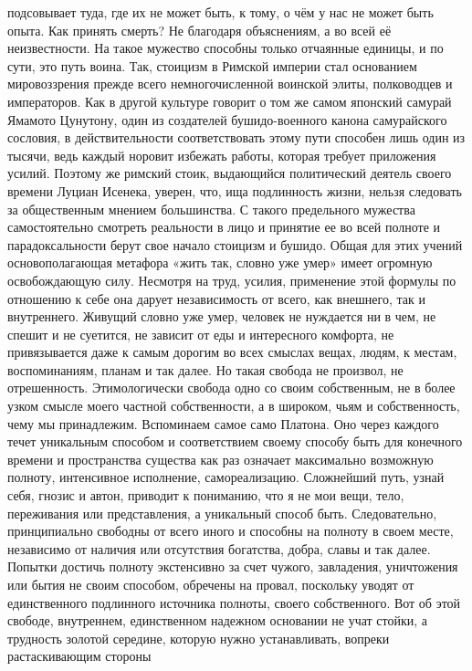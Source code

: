 подсовывает туда, где их не может быть, к тому, о чём у нас не может быть опыта.
Как принять смерть? Не благодаря объяснениям, а во всей её неизвестности. На
такое мужество способны только отчаянные единицы, и по сути, это путь воина.
Так, стоицизм в Римской империи стал основанием мировоззрения прежде всего
немногочисленной воинской элиты, полководцев и императоров. Как в другой
культуре говорит о том же самом японский самурай Ямамото Цунутону, один из
создателей бушидо-военного канона самурайского сословия, в действительности
соответствовать этому пути способен лишь один из тысячи, ведь каждый норовит
избежать работы, которая требует приложения усилий. Поэтому же римский стоик,
выдающийся политический деятель своего времени Луциан Исенека, уверен, что, ища
подлинность жизни, нельзя следовать за общественным мнением большинства. С
такого предельного мужества самостоятельно смотреть реальности в лицо и принятие
ее во всей полноте и парадоксальности берут свое начало стоицизм и бушидо. Общая
для этих учений основополагающая метафора «жить так, словно уже умер» имеет
огромную освобождающую силу. Несмотря на труд, усилия, применение этой формулы
по отношению к себе она дарует независимость от всего, как внешнего, так и
внутреннего. Живущий словно уже умер, человек не нуждается ни в чем, не спешит и
не суетится, не зависит от еды и интересного комфорта, не привязывается даже к
самым дорогим во всех смыслах вещах, людям, к местам, воспоминаниям, планам и
так далее. Но такая свобода не произвол, не отрешенность. Этимологически свобода
одно со своим собственным, не в более узком смысле моего частной собственности,
а в широком, чьям и собственность, чему мы принадлежим. Вспоминаем самое само
Платона. Оно через каждого течет уникальным способом и соответствием своему
способу быть для конечного времени и пространства существа как раз означает
максимально возможную полноту, интенсивное исполнение, самореализацию.
Сложнейший путь, узнай себя, гнозис и автон, приводит к пониманию, что я не мои
вещи, тело, переживания или представления, а уникальный способ быть.
Следовательно, принципиально свободны от всего иного и способны на полноту в
своем месте, независимо от наличия или отсутствия богатства, добра, славы и так
далее. Попытки достичь полноту экстенсивно за счет чужого, завладения,
уничтожения или бытия не своим способом, обречены на провал, поскольку уводят от
единственного подлинного источника полноты, своего собственного. Вот об этой
свободе, внутреннем, единственном надежном основании не учат стойки, а трудность
золотой середине, которую нужно устанавливать, вопреки растаскивающим стороны
